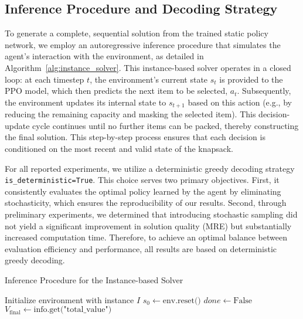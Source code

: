 \subsection{Inference Procedure and Decoding Strategy}
\label{sec:inference_procedure}

To generate a complete, sequential solution from the trained static policy network, we employ an autoregressive inference procedure that simulates the agent's interaction with the environment, as detailed in Algorithm~\ref{alg:instance_solver}. This instance-based solver operates in a closed loop: at each timestep $t$, the environment's current state $s_t$ is provided to the PPO model, which then predicts the next item to be selected, $a_t$. Subsequently, the environment updates its internal state to $s_{t+1}$ based on this action (e.g., by reducing the remaining capacity and masking the selected item). This decision-update cycle continues until no further items can be packed, thereby constructing the final solution. This step-by-step process ensures that each decision is conditioned on the most recent and valid state of the knapsack.

For all reported experiments, we utilize a deterministic greedy decoding strategy \texttt{is\_deterministic=True}. This choice serves two primary objectives. First, it consistently evaluates the optimal policy learned by the agent by eliminating stochasticity, which ensures the reproducibility of our results. Second, through preliminary experiments, we determined that introducing stochastic sampling did not yield a significant improvement in solution quality (MRE) but substantially increased computation time. Therefore, to achieve an optimal balance between evaluation efficiency and performance, all results are based on deterministic greedy decoding.

\begin{algorithm}[htbp]
    \caption{Inference Procedure for the Instance-based Solver}
    \label{alg:instance_solver}
    \BlankLine
    Initialize environment with instance $I$\;
    $s_0 \leftarrow \text{env.reset()}$\;
    $done \leftarrow \text{False}$\;
    \BlankLine
    \BlankLine
    $V_{\text{final}} \leftarrow \text{info.get("total\_value")}$\;
    \;
\end{algorithm}

